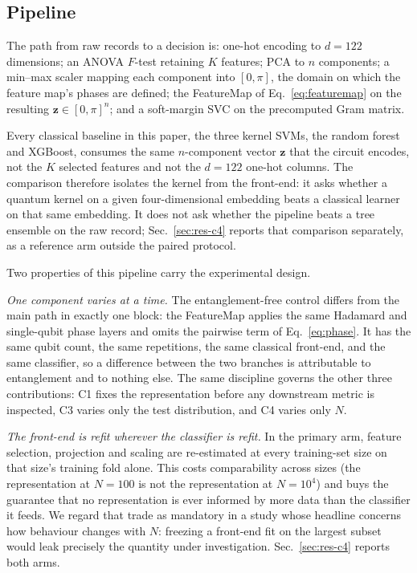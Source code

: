 \subsection{Pipeline}
\begin{revbody}

The path from raw records to a decision is: one-hot encoding to $d=122$
dimensions; an ANOVA $F$-test retaining $K$ features; PCA to $n$ components; a
min--max scaler mapping each component into $[0,\pi]$, the domain on which the
feature map's phases are defined; the \ZZ{}FeatureMap of
Eq.~\eqref{eq:featuremap} on the resulting $\bm{z}\in[0,\pi]^{n}$; and a
soft-margin SVC on the precomputed Gram matrix.

Every classical baseline in this paper, the three kernel SVMs, the random
forest and XGBoost, consumes the same $n$-component vector $\bm{z}$ that the
circuit encodes, not the $K$ selected features and not the $d=122$ one-hot
columns. The comparison therefore isolates the kernel from the front-end: it
asks whether a quantum kernel on a given four-dimensional embedding beats a
classical learner on that same embedding. It does not ask whether the pipeline
beats a tree ensemble on the raw record; Sec.~\ref{sec:res-c4} reports that
comparison separately, as a reference arm outside the paired protocol.

Two properties of this pipeline carry the experimental design.

\emph{One component varies at a time.} The entanglement-free control differs
from the main path in exactly one block: the \Zmap{}FeatureMap applies the same
Hadamard and single-qubit phase layers and omits the pairwise term of
Eq.~\eqref{eq:phase}. It has the same qubit count, the same repetitions, the
same classical front-end, and the same classifier, so a difference between the
two branches is attributable to entanglement and to nothing else. The same
discipline governs the other three contributions: C1 fixes the representation
before any downstream metric is inspected, C3 varies only the test
distribution, and C4 varies only $N$.

\emph{The front-end is refit wherever the classifier is refit.} In the primary
arm, feature selection, projection and scaling are re-estimated at every
training-set size on that size's training fold alone. This costs comparability
across sizes (the representation at $N=100$ is not the representation at
$N=10^{4}$) and buys the guarantee that no representation is ever informed by
more data than the classifier it feeds. We regard that trade as mandatory in a
study whose headline concerns how behaviour changes with $N$: freezing a
front-end fit on the largest subset would leak precisely the quantity under
investigation. Sec.~\ref{sec:res-c4} reports both arms.
\end{revbody}

